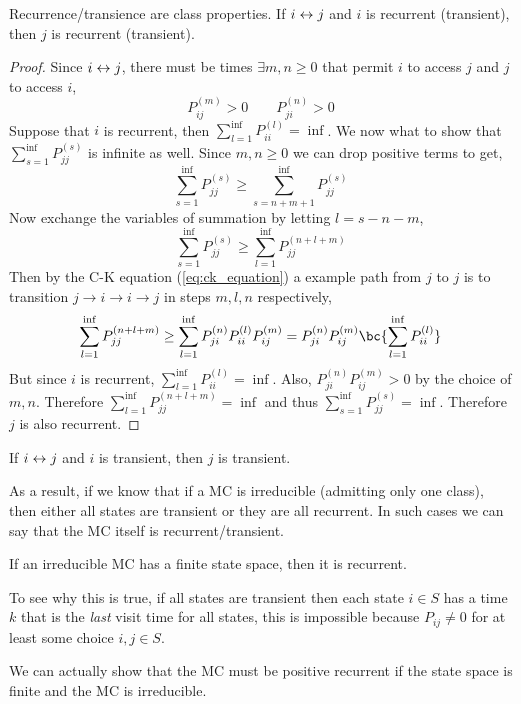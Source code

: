\documentclass{article}
\begin{document}
\begin{theorem}
Recurrence/transience are class properties. If $i \leftrightarrow j$ and $i$ is recurrent (transient), then $j$ is recurrent (transient).
\end{theorem}
\begin{proof}
    Since $i \leftrightarrow j$, there must be times $\exists m,n \geq 0$ that permit $i$ to access $j$ and $j$ to access $i$,
    \[ P_{ij}^{(m)} > 0 \qquad P_{ji}^{(n)} > 0 \]
    Suppose that $i$ is recurrent, then $\sum_{l=1}^{\inf}P_{ii}^{(l)} = \inf$. We now what to show that $\sum_{s=1}^{\inf}P_{jj}^{(s)}$ is infinite as well. Since $m,n \geq 0$ we can drop positive terms to get,
    \[ \sum_{s=1}^{\inf}P_{jj}^{(s)} \geq \sum_{s=n+m+1}^{\inf}P_{jj}^{(s)} \]
    Now exchange the variables of summation by letting $l = s- n-m$,
    \[ \sum_{s=1}^{\inf}P_{jj}^{(s)} \geq \sum_{l=1}^{\inf}P_{jj}^{(n+l+m)} \]
    Then by the C-K equation (\cref{eq:ck_equation}) a example path from $j$ to $j$ is to transition $j \to i \to i \to j$ in steps $m, l, n$ respectively,
    \[ \sum_{l=1}^{\inf}P_{jj}^{(n+l+m)} \geq  \sum_{l=1}^{\inf}P_{ji}^{(n)}P_{ii}^{(l)}P_{ij}^{(m)} = P_{ji}^{(n)}P_{ij}^{(m)}\bc{\sum_{l=1}^{\inf}P_{ii}^{(l)}} \]
    But since $i$ is recurrent, $\sum_{l=1}^{\inf}P_{ii}^{(l)} = \inf$. Also, $P_{ji}^{(n)}P_{ij}^{(m)} > 0$ by the choice of $m,n$. Therefore $\sum_{l=1}^{\inf}P_{jj}^{(n+l+m)} = \inf$ and thus $\sum_{s=1}^{\inf}P_{jj}^{(s)} = \inf$. Therefore $j$ is also recurrent.
\end{proof}
\begin{corollary}
    If $i \leftrightarrow j$ and $i$ is transient, then $j$ is transient.
\end{corollary}
As a result, if we know that if a MC is irreducible (admitting only one class), then either all states are transient or they are all recurrent. In such cases we can say that the MC itself is recurrent/transient.

\begin{theorem}
    If an irreducible MC has a finite state space, then it is recurrent.
\end{theorem}

To see why this is true, if all states are transient then each state $i \in S$ has a time $k$ that is the \textit{last} visit time for all states, this is impossible because $P_{ij} \neq 0$ for at least some choice $i,j \in S$.

\begin{remark}
    We can actually show that the MC must be positive recurrent if the state space is finite and the MC is irreducible.
\end{remark}
\end{document}
